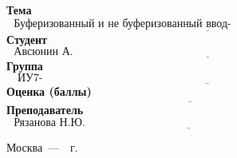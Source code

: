 \begin{titlepage}
	\noindent\textbf{Тема} $\underline{\text{~~Буферизованный и не буферизованный ввод-вывод.~~~~~~~~~~~~~~~~~~~~~~~~~~~~~~~~~~~~~~~~~~}}$\newline\newline
	\noindent\textbf{Студент} $\underline{\text{~~Авсюнин А. А.~~~~~~~~~~~~~~~~~~~~~~~~~~~~~~~~~~~~~~~~~~~~~~~~~~~~~~~~~~~~~~~~~~~~~~~~~~~~~~~~~~~~~~~~}}$\newline\newline
	\noindent\textbf{Группа} $\underline{\text{~~~ИУ7-66Б~~~~~~~~~~~~~~~~~~~~~~~~~~~~~~~~~~~~~~~~~~~~~~~~~~~~~~~~~~~~~~~~~~~~~~~~~~~~~~~~~~~~~~~~~~~~~~~~~}}$\newline\newline
	\noindent\textbf{Оценка (баллы)} $\underline{\text{~~~~~~~~~~~~~~~~~~~~~~~~~~~~~~~~~~~~~~~~~~~~~~~~~~~~~~~~~~~~~~~~~~~~~~~~~~~~~~~~~~~~~~~~~~~~~~~~~~~}}$\newline\newline
	\noindent\textbf{Преподаватель} $\underline{\text{~~Рязанова Н.Ю.~~~~~~~~~~~~~~~~~~~~~~~~~~~~~~~~~~~~~~~~~~~~~~~~~~~~~~~~~~~~~~~~~~~~~~~~~~~~~}}$\newline

	\begin{center}
		\vfill
		Москва~---~\the\year~г.
	\end{center}
	\restoregeometry
\end{titlepage}

